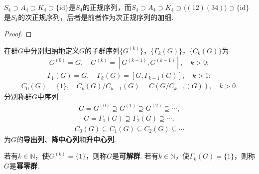 \documentclass[../../main.tex]{subfiles}%
\begin{document}
\begin{example}
$S_4 \supset A_4 \supset K_4 \supset \{\mathrm{id}\}$是$S_4$的正规序列，而$S_4 \supset A_4 \supset K_4 \supset \langle (12)(34) \rangle \supset \{\mathrm{id}\}$是$S_4$的次正规序列，后者是前者作为次正规序列的加细.
\end{example}
\begin{proof}



\end{proof}

\begin{definition}
在群$G$中分别归纳地定义$G$的子群序列$\{G^{(k)}\}$，$\{\Gamma_k(G)\}$，$\{C_k(G)\}$为
\begin{align*}
G^{(0)} = G,\quad G^{(k)} = [G^{(k-1)}, G^{(k-1)}],\quad k > 0;
\end{align*}
\begin{align*}
\Gamma_1(G) = G,\quad \Gamma_k(G) = [G, \Gamma_{k-1}(G)],\quad k > 1;
\end{align*}
\begin{align*}
C_0(G) = \{1\},\quad C_k(G)/C_{k-1}(G) = C(G/C_{k-1}(G)),\quad k > 0.
\end{align*}
分别称群$G$中序列
\begin{align*}
G = G^{(0)} \supseteq G^{(1)} \supseteq G^{(2)} \supseteq \cdots,
\end{align*}
\begin{align*}
G = \Gamma_1(G) \supseteq \Gamma_2(G) \supseteq \cdots,
\end{align*}
\begin{align*}
C_0(G) \subseteq C_1(G) \subseteq C_2(G) \subseteq \cdots
\end{align*}
为$G$的\textbf{导出列}、\textbf{降中心列}和\textbf{升中心列}.

若有$k\in \mathbb{N}$，使$G^{(k)} = \{1\}$，则称$G$是\textbf{可解群}. 若有$k\in \mathbb{N}$，使$\Gamma_k(G) = \{1\}$，则称$G$是\textbf{幂零群}.
\end{definition}
\end{document}
